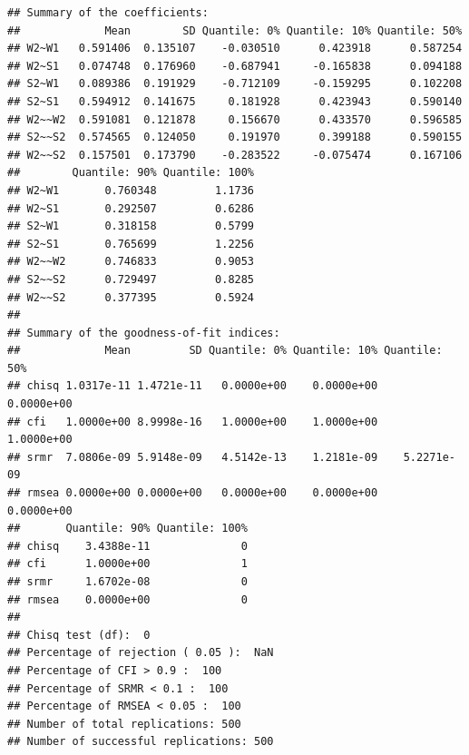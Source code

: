 \documentclass[]{article}
\newenvironment{Shaded}{\begin{snugshade}}{\end{snugshade}}
\newcommand{\KeywordTok}[1]{\textcolor[rgb]{0.13,0.29,0.53}{\textbf{#1}}}
\newcommand{\DataTypeTok}[1]{\textcolor[rgb]{0.13,0.29,0.53}{#1}}
\newcommand{\StringTok}[1]{\textcolor[rgb]{0.31,0.60,0.02}{#1}}
\newcommand{\OperatorTok}[1]{\textcolor[rgb]{0.81,0.36,0.00}{\textbf{#1}}}
\newcommand{\NormalTok}[1]{#1}
\begin{document}
\begin{verbatim}
## Summary of the coefficients:
##             Mean        SD Quantile: 0% Quantile: 10% Quantile: 50%
## W2~W1   0.591406  0.135107    -0.030510      0.423918      0.587254
## W2~S1   0.074748  0.176960    -0.687941     -0.165838      0.094188
## S2~W1   0.089386  0.191929    -0.712109     -0.159295      0.102208
## S2~S1   0.594912  0.141675     0.181928      0.423943      0.590140
## W2~~W2  0.591081  0.121878     0.156670      0.433570      0.596585
## S2~~S2  0.574565  0.124050     0.191970      0.399188      0.590155
## W2~~S2  0.157501  0.173790    -0.283522     -0.075474      0.167106
##        Quantile: 90% Quantile: 100%
## W2~W1       0.760348         1.1736
## W2~S1       0.292507         0.6286
## S2~W1       0.318158         0.5799
## S2~S1       0.765699         1.2256
## W2~~W2      0.746833         0.9053
## S2~~S2      0.729497         0.8285
## W2~~S2      0.377395         0.5924
## 
## Summary of the goodness-of-fit indices:
##             Mean         SD Quantile: 0% Quantile: 10% Quantile: 50%
## chisq 1.0317e-11 1.4721e-11   0.0000e+00    0.0000e+00    0.0000e+00
## cfi   1.0000e+00 8.9998e-16   1.0000e+00    1.0000e+00    1.0000e+00
## srmr  7.0806e-09 5.9148e-09   4.5142e-13    1.2181e-09    5.2271e-09
## rmsea 0.0000e+00 0.0000e+00   0.0000e+00    0.0000e+00    0.0000e+00
##       Quantile: 90% Quantile: 100%
## chisq    3.4388e-11              0
## cfi      1.0000e+00              1
## srmr     1.6702e-08              0
## rmsea    0.0000e+00              0
## 
## Chisq test (df):  0
## Percentage of rejection ( 0.05 ):  NaN
## Percentage of CFI > 0.9 :  100
## Percentage of SRMR < 0.1 :  100
## Percentage of RMSEA < 0.05 :  100
## Number of total replications: 500
## Number of successful replications: 500
\end{verbatim}

\begin{Shaded}
\end{Shaded}
\end{document}
